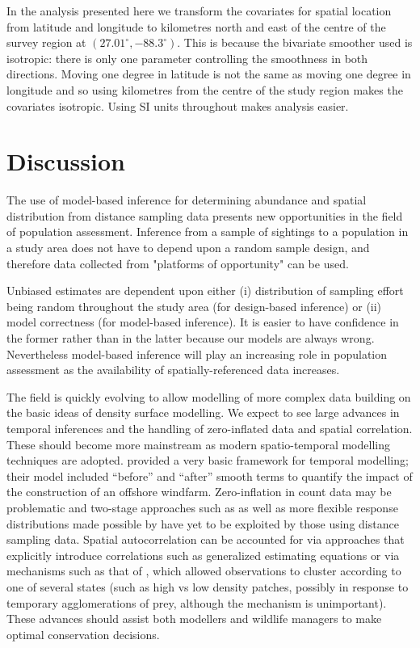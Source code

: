 \documentclass[a4paper,12pt]{article}
\begin{document}
In the analysis presented here we transform the covariates for spatial location from latitude and longitude to kilometres north and east of the centre of the survey region at $(27.01^\circ, -88.3^\circ)$. This is because the bivariate smoother used \citep[the thin plate spline;][]{Wood:2003tc} is isotropic: there is only one parameter controlling the smoothness in both directions. Moving one degree in latitude is not the same as moving one degree in longitude and so using kilometres from the centre of the study region makes the covariates isotropic. Using SI units throughout makes analysis easier.



\section*{Discussion}
\label{s:discussion}

The use of model-based inference for determining abundance and spatial distribution from distance sampling data presents new opportunities in the field of population assessment.   Inference from a sample of sightings to a population in a study area does not have to depend upon a random sample design, and therefore data collected from "platforms of opportunity" \citep{Williams:2006tz} can be used.

Unbiased estimates are dependent upon either (i) distribution of sampling effort being random throughout the study area (for design-based inference) or (ii) model correctness (for model-based inference).  It is easier to have confidence in the former rather than in the latter because our models are always wrong. Nevertheless model-based inference will play an increasing role in population assessment as the availability of spatially-referenced data increases.

The field is quickly evolving to allow modelling of more complex data building on the basic ideas of density surface modelling. We expect to see large advances in temporal inferences and the handling of zero-inflated data and spatial correlation. These should become more mainstream as modern spatio-temporal modelling techniques are adopted. \cite{Petersen:2011vy} provided a very basic framework for temporal modelling; their model included ``before'' and ``after'' smooth terms to quantify the impact of the construction of an offshore windfarm. Zero-inflation in count data may be problematic and two-stage approaches such as \cite{Barry:2002bm} as well as more flexible response distributions made possible by \cite{Rigby:2005wb} have yet to be exploited by those using distance sampling data. Spatial autocorrelation can be accounted for via approaches that explicitly introduce correlations such as generalized estimating equations \cite[GEEs;][]{Hardin:2003uf} or via mechanisms such as that of \cite{Skaug:2006gs},  which allowed observations to cluster according to one of several states (such as high vs low density patches, possibly in response to temporary agglomerations of prey, although the mechanism is unimportant). These advances should assist both modellers and wildlife managers to make optimal conservation decisions. 
\end{document}
